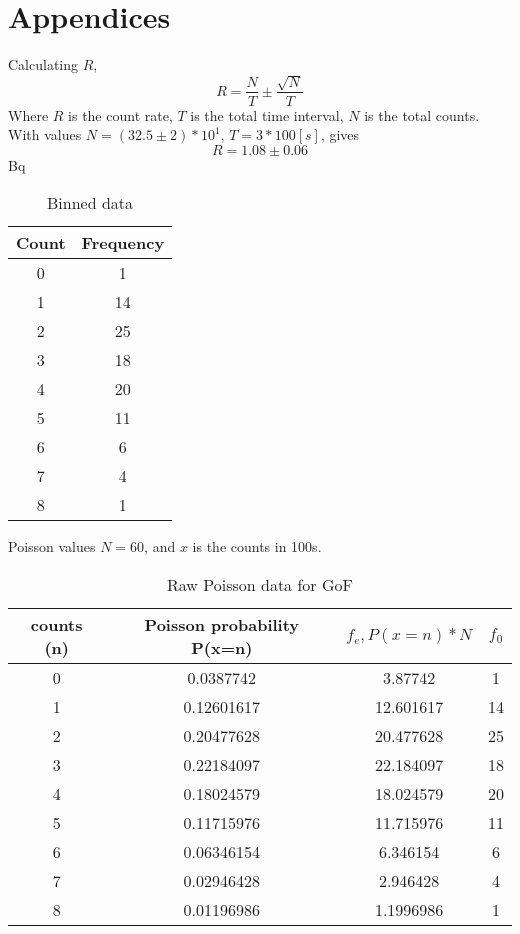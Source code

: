 \documentclass[11pt]{article}
\begin{document}
    \section{Appendices}
    Calculating $R$, $$ R = \frac{N}{T} \pm \frac{\sqrt{N}}{T}$$
    Where $R$ is the count rate, $T$ is the total time interval, $N$ is the total counts. With values $N =( 32.5 \pm 2) * 10^{1}$, $T= 3 * 100 [s]$, gives 
    $$R = 1.08 \pm 0.06$$ Bq
    \begin{table}[b]
        \centering
        \begin{tabular}{|c|c|}
        \hline
          \textbf{Count}  & \textbf{Frequency} \\
          \hline
           0  & 1 \\
           1 & 14\\
           2  & 25 \\
           3  & 18 \\
           4  & 20 \\
           5  & 11 \\
           6  & 6\\
           7  & 4 \\
           8  & 1 \\
           
           \hline
        \end{tabular}
        \caption{Binned data}
        \label{tab:my_label}
    \end{table}
    Poisson values 
    $N = 60$, and $x$ is the counts in 100s. 
    \begin{table}[]
        \centering
        \begin{tabular}{|c|c|c|c|}
         \hline
           counts (n)  & Poisson probability P(x=n) & $ f_{e}, P(x=n) * N$ & $f_{0}$ \\
            \hline
            0 & 0.0387742 & 3.87742 & 1 \\
            1 & 0.12601617 & 12.601617 & 14\\
            2 & 0.20477628 & 20.477628 & 25\\
            3 & 0.22184097 & 22.184097 & 18\\
            4 & 0.18024579 & 18.024579 & 20\\
            5 & 0.11715976 & 11.715976 & 11\\
            6 & 0.06346154 & 6.346154 & 6 \\
            7 & 0.02946428 & 2.946428 & 4\\
            8 & 0.01196986 & 1.1996986 & 1\\
             \hline

        \end{tabular}
        \caption{Raw Poisson data for GoF}
        \label{tab:my_label}
    \end{table}
\end{document}
